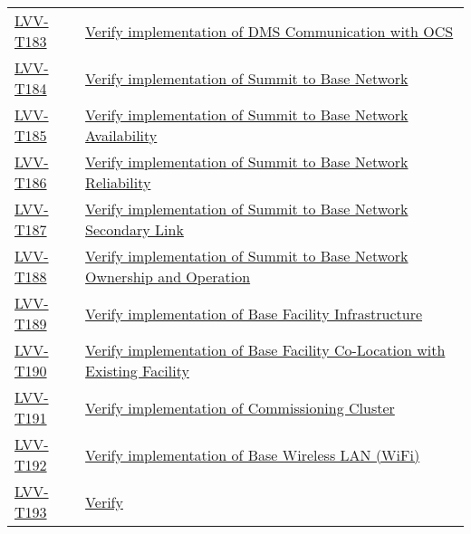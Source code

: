 \begin{longtable}[]{p{3cm}p{13cm}}
\protect\hyperlink{lvv-t183---verify-implementation-of-dms-communication-with-ocs}{LVV-T183}
&
\href{https://jira.lsstcorp.org/secure/Tests.jspa\#/testCase/LVV-T183}{Verify
implementation of DMS Communication with OCS}\tabularnewline
\protect\hyperlink{lvv-t184---verify-implementation-of-summit-to-base-network}{LVV-T184}
&
\href{https://jira.lsstcorp.org/secure/Tests.jspa\#/testCase/LVV-T184}{Verify
implementation of Summit to Base Network}\tabularnewline
\protect\hyperlink{lvv-t185---verify-implementation-of-summit-to-base-network-availability}{LVV-T185}
&
\href{https://jira.lsstcorp.org/secure/Tests.jspa\#/testCase/LVV-T185}{Verify
implementation of Summit to Base Network Availability}\tabularnewline
\protect\hyperlink{lvv-t186---verify-implementation-of-summit-to-base-network-reliability}{LVV-T186}
&
\href{https://jira.lsstcorp.org/secure/Tests.jspa\#/testCase/LVV-T186}{Verify
implementation of Summit to Base Network Reliability}\tabularnewline
\protect\hyperlink{lvv-t187---verify-implementation-of-summit-to-base-network-secondary-link}{LVV-T187}
&
\href{https://jira.lsstcorp.org/secure/Tests.jspa\#/testCase/LVV-T187}{Verify
implementation of Summit to Base Network Secondary Link}\tabularnewline
\protect\hyperlink{lvv-t188---verify-implementation-of-summit-to-base-network-ownership-and-operation}{LVV-T188}
&
\href{https://jira.lsstcorp.org/secure/Tests.jspa\#/testCase/LVV-T188}{Verify
implementation of Summit to Base Network Ownership and
Operation}\tabularnewline
\protect\hyperlink{lvv-t189---verify-implementation-of-base-facility-infrastructure}{LVV-T189}
&
\href{https://jira.lsstcorp.org/secure/Tests.jspa\#/testCase/LVV-T189}{Verify
implementation of Base Facility Infrastructure}\tabularnewline
\protect\hyperlink{lvv-t190---verify-implementation-of-base-facility-co-location-with-existing-facility}{LVV-T190}
&
\href{https://jira.lsstcorp.org/secure/Tests.jspa\#/testCase/LVV-T190}{Verify
implementation of Base Facility Co-Location with Existing
Facility}\tabularnewline
\protect\hyperlink{lvv-t191---verify-implementation-of-commissioning-cluster}{LVV-T191}
&
\href{https://jira.lsstcorp.org/secure/Tests.jspa\#/testCase/LVV-T191}{Verify
implementation of Commissioning Cluster}\tabularnewline
\protect\hyperlink{lvv-t192---verify-implementation-of-base-wireless-lan-wifi}{LVV-T192}
&
\href{https://jira.lsstcorp.org/secure/Tests.jspa\#/testCase/LVV-T192}{Verify
implementation of Base Wireless LAN (WiFi)}\tabularnewline
\protect\hyperlink{lvv-t193---verify-implementation-of-base-to-archive-network}{LVV-T193}
&
\href{https://jira.lsstcorp.org/secure/Tests.jspa\#/testCase/LVV-T193}{Verify
}
\end{longtable}
